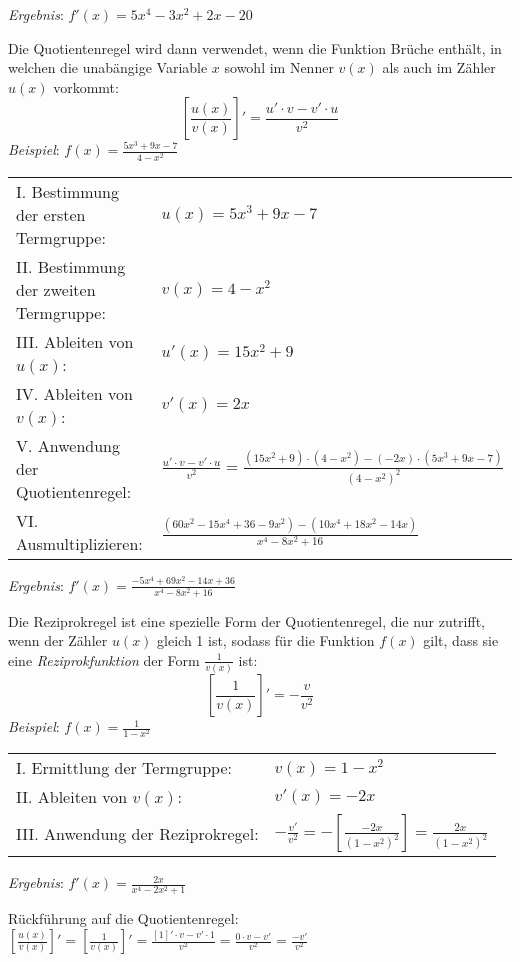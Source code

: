 \emph{Ergebnis}: $f'(x) = 5x^4 - 3x^2 + 2x - 20$

\pagebreak


Die Quotientenregel wird dann verwendet, wenn die Funktion Br\"{u}che enth\"{a}lt, in welchen die unab\"{a}ngige Variable $x$ sowohl im Nenner $v(x)$ als auch im Z\"{a}hler $u(x)$ vorkommt: $$\left[\frac{u(x)}{v(x)}\right]' = \frac{u' \cdot v - v' \cdot u}{v^2}$$
\emph{Beispiel}: $f(x) = \frac{5x^3 + 9x - 7}{4-x^2}$

\begin{tabular}{l l}
	I. Bestimmung der ersten Termgruppe: & $u(x) = 5x^3 + 9x - 7$
	\extrapar \\
	II. Bestimmung der zweiten Termgruppe: & $v(x) = 4 - x^2$
	\extrapar \\
	III. Ableiten von $u(x)$: & $u'(x) = 15x^2 + 9$
	\extrapar \\
	IV. Ableiten von $v(x)$: & $v'(x) = 2x$
	\extrapar \\
	V. Anwendung der Quotientenregel: & $\frac{u' \cdot v - v' \cdot u}{v^2} = \frac{(15x^2 + 9) \cdot (4-x^2) - (-2x) \cdot (5x^3 + 9x - 7)}{(4-x^2)^2}$
	\extrapar \\
	VI. Ausmultiplizieren: & $\frac{(60x^2 - 15x^4 + 36 - 9x^2) - (10x^4 + 18x^2 - 14x)}{x^4 - 8x^2 + 16}$
\end{tabular}

\emph{Ergebnis}: $f'(x) = \frac{-5x^4 + 69x^2 - 14x + 36}{x^4 - 8x^2 + 16}$


Die Reziprokregel ist eine spezielle Form der Quotientenregel, die nur zutrifft, wenn der Z\"{a}hler $u(x)$ gleich 1 ist, sodass f\"{u}r die Funktion $f(x)$ gilt, dass sie eine \emph{Reziprokfunktion} der Form $\frac{1}{v(x)}$ ist: $$\left[\frac{1}{v(x)}\right]' = -\frac{v}{v^2}$$
\emph{Beispiel}: $f(x) = \frac{1}{1 - x^2}$

\begin{tabular}{l l}
	I. Ermittlung der Termgruppe: & $v(x) = 1 - x^2$
	\extrapar \\
	II. Ableiten von $v(x)$: & $v'(x) = -2x$
	\extrapar \\
	III. Anwendung der Reziprokregel: & $-\frac{v'}{v^2} = -\left[\frac{-2x}{(1-x^2)^2}\right] = \frac{2x}{(1-x^2)^2}$
\end{tabular}

\emph{Ergebnis}: $f'(x) = \frac{2x}{x^4 - 2x^2 + 1}$

R\"{u}ckf\"{u}hrung auf die Quotientenregel: \hspace{1cm} $\left[\frac{u(x)}{v(x)}\right]' = \left[\frac{1}{v(x)}\right]' = \frac{[1]' \cdot v - v' \cdot 1}{v^2} = \frac{0 \cdot v - v'}{v^2} = \frac{-v'}{v^2}$


